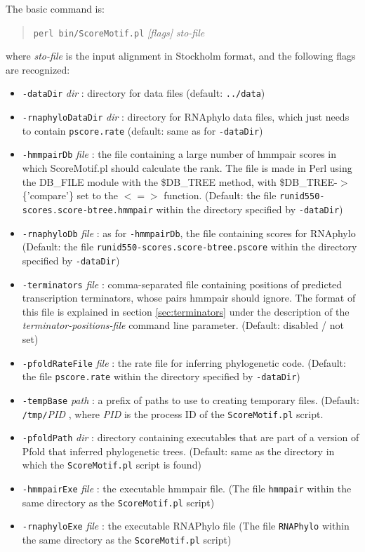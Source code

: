 \documentclass[letterpaper,12pt]{report}
\newcommand{\example}[1]{
\begin{quote}
{\raggedright
#1
}
\end{quote}
}
\begin{document}
The basic command is:
\example{
{\tt perl bin/ScoreMotif.pl} {\it [flags]} {\it sto-file}
}
where {\it sto-file} is the input alignment in Stockholm format, and the following flags are recognized:
\begin{itemize}
\item {\tt -dataDir} {\it dir} : directory for data files (default: {\tt ../data})
\item {\tt -rnaphyloDataDir} {\it dir} : directory for RNAphylo data files, which just needs to contain {\tt pscore.rate} (default: same as for {\tt -dataDir})
\item {\tt -hmmpairDb} {\it file} : the file containing a large number of hmmpair scores in which ScoreMotif.pl should calculate the rank.  The file is made in Perl using the DB\_FILE module with the \$DB\_TREE method, with \$DB\_TREE-$>$\{'compare'\} set to the $<=>$ function. (Default: the file {\tt runid550-scores.score-btree.hmmpair} within the directory specified by {\tt -dataDir})
\item {\tt -rnaphyloDb} {\it file} : as for {\tt -hmmpairDb}, the file containing scores for RNAphylo (Default: the file {\tt runid550-scores.score-btree.pscore} within the directory specified by {\tt -dataDir})
\item {\tt -terminators} {\it file} : comma-separated file containing positions of predicted transcription terminators, whose pairs hmmpair should ignore.  The format of this file is explained in section \ref{sec:terminators} under the description of the {\it terminator-positions-file} command line parameter.  (Default: disabled / not set)
\item {\tt -pfoldRateFile} {\it file} : the rate file for inferring phylogenetic code. (Default: the file {\tt pscore.rate} within the directory specified by {\tt -dataDir})
\item {\tt -tempBase} {\it path} : a prefix of paths to use to creating temporary files. (Default: {\tt /tmp/}{\it PID} , where {\it PID} is the process ID of the {\tt ScoreMotif.pl} script.
\item {\tt -pfoldPath} {\it dir} : directory containing executables that are part of a version of Pfold that inferred phylogenetic trees. (Default: same as the directory in which the {\tt ScoreMotif.pl} script is found)
\item {\tt -hmmpairExe} {\it file} : the executable hmmpair file. (The file {\tt hmmpair} within the same directory as the {\tt ScoreMotif.pl} script)
\item {\tt -rnaphyloExe} {\it file} : the executable RNAPhylo file (The file {\tt RNAPhylo} within the same directory as the {\tt ScoreMotif.pl} script)
\end{itemize}
\end{document}
